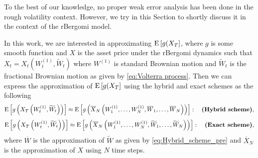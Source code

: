 To the best of our knowledge, no proper weak error
analysis has been done in the rough volatility context. However, we try in this Section  to shortly discuss it in the context of the rBergomi model.

In this work, we are interested in approximating $\mathrm{E}\left[g(X_T\right]$, where $g$ is some smooth function and $X$ is the asset price under the rBergomi dynamics such that $X_t=X_t(W^{(1)}_t,\widetilde{W}_t)$ where $W^{(1)}$ is standard Brownian motion and  $\widetilde{W}_t$ is the fractional Brownian motion as given by \eqref{eq:Volterra process}.  Then we can express the approximation of $\mathrm{E}\left[g(X_T\right]$  using the  hybrid and exact schemes as the following 
\begin{align*}
\mathrm{E}\left[g\left(X_T\left(W^{(1)}_t,\widetilde{W}_t \right)\right)\right] \approx \mathrm{E}\left[g\left(\overline{X}_N\left(W^{(1)}_1,\dots,W^{(1)}_N, \overline{W}_1, \dots,\overline{W}_N\right)\right)\right]:\quad \textbf{(Hybrid  scheme)},
\end{align*}
\begin{align*}
\mathrm{E}\left[g\left(X_T\left(W^{(1)}_t,\widetilde{W}_t\right)\right)\right] \approx \mathrm{E}\left[g\left(\overline{X}_N\left(W^{(1)}_1,\dots,W^{(1)}_N, \widetilde{W}_1, \dots,\widetilde{W}_N\right)\right)\right]:\quad \textbf{(Exact  scheme)},
\end{align*}
where $\overline{W}$ is the approximation of $\widetilde{W}$  as given by \eqref{eq:Hybrid_scheme_pre} and $\overline{X}_N$ is the approximation of $X$ using $N$ time steps.

